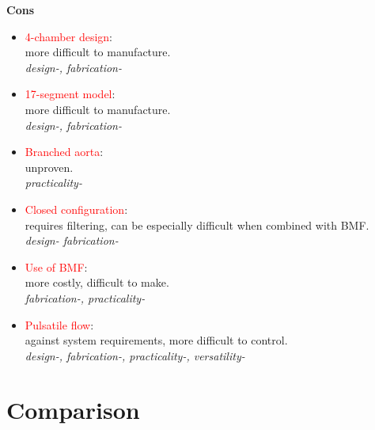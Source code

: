 \begin{minipage}[t]{0.5\textwidth}
\centering\textbf{Cons}
\begin{itemize} [noitemsep]
	\item \textcolor{red}{4-chamber design}: \\ more difficult to manufacture. \\ \textit{design-, fabrication-}
	\item \textcolor{red}{17-segment model}: \\ more difficult to manufacture. \\ \textit{design-, fabrication-}
	\item \textcolor{red}{Branched aorta}: \\ unproven. \\ \textit{practicality-}
	\item \textcolor{red}{Closed configuration}: \\ requires filtering, can be especially difficult when combined with BMF. \\ \textit{design- fabrication-}
	\item \textcolor{red}{Use of BMF}: \\ more costly, difficult to make. \\ \textit{fabrication-, practicality-}
	\item \textcolor{red}{Pulsatile flow}: \\ against system requirements, more difficult to control. \\ \textit{design-, fabrication-, practicality-, versatility-}
\end{itemize}
\end{minipage}

\section{Comparison}
